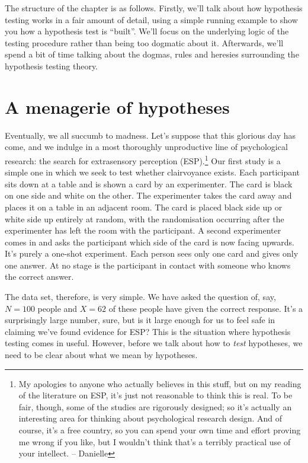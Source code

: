 \documentclass[
]{book}
\theoremstyle{definition}
\theoremstyle{definition}
\theoremstyle{definition}
\theoremstyle{definition}
\theoremstyle{remark}
\begin{document}
The structure of the chapter is as follows. Firstly, we'll talk about how hypothesis testing works in a fair amount of detail, using a simple running example to show you how a hypothesis test is ``built''. We'll focus on the underlying logic of the testing procedure rather than being too dogmatic about it. Afterwards, we'll spend a bit of time talking about the dogmas, rules and heresies surrounding the hypothesis testing theory.

\hypertarget{hypotheses}{%
\section{A menagerie of hypotheses}\label{hypotheses}}

Eventually, we all succumb to madness. Let's suppose that this glorious day has come, and we indulge in a most thoroughly unproductive line of psychological research: the search for extrasensory perception (ESP).\footnote{My apologies to anyone who actually believes in this stuff, but on my reading of the literature on ESP, it's just not reasonable to think this is real. To be fair, though, some of the studies are rigorously designed; so it's actually an interesting area for thinking about psychological research design. And of course, it's a free country, so you can spend your own time and effort proving me wrong if you like, but I wouldn't think that's a terribly practical use of your intellect. -- Danielle} Our first study is a simple one in which we seek to test whether clairvoyance exists. Each participant sits down at a table and is shown a card by an experimenter. The card is black on one side and white on the other. The experimenter takes the card away and places it on a table in an adjacent room. The card is placed black side up or white side up entirely at random, with the randomisation occurring after the experimenter has left the room with the participant. A second experimenter comes in and asks the participant which side of the card is now facing upwards. It's purely a one-shot experiment. Each person sees only one card and gives only one answer. At no stage is the participant in contact with someone who knows the correct answer.

The data set, therefore, is very simple. We have asked the question of, say, \(N = 100\) people and \(X = 62\) of these people have given the correct response. It's a surprisingly large number, sure, but is it large enough for us to feel safe in claiming we've found evidence for ESP? This is the situation where hypothesis testing comes in useful. However, before we talk about how to \emph{test} hypotheses, we need to be clear about what we mean by hypotheses.
\end{document}
